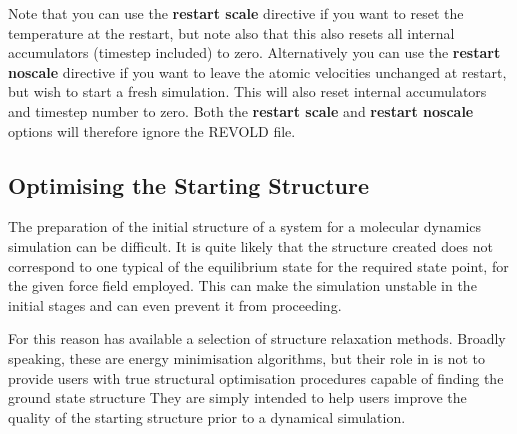 Note that you can use the {\bf restart scale} directive if you want to reset
the temperature at the restart, but note also that this also resets all
internal accumulators (timestep included) to zero. Alternatively you can use
the {\bf restart noscale} directive if you want to leave the atomic velocities
unchanged at restart, but wish to start a fresh simulation. This will also
reset internal accumulators and timestep number to zero. Both the {\bf restart
  scale} and {\bf restart noscale} options will therefore ignore the REVOLD
file.

\subsection{Optimising the Starting Structure}
\label{minimisation}
The preparation of the initial structure of a system for a molecular
dynamics simulation can be difficult. It is quite likely that the
structure created does not correspond to one typical of the
equilibrium state for the required state point, for the given force
field employed. This can make the simulation unstable in the initial
stages and can even prevent it from proceeding.

For this reason \D{} has available a selection of structure relaxation
methods. Broadly speaking, these are energy minimisation algorithms,
but their role in \D{} is not to provide users with true structural
optimisation procedures capable of finding the ground state structure
They are simply intended to help users improve the quality of the
starting structure prior to a dynamical simulation.


